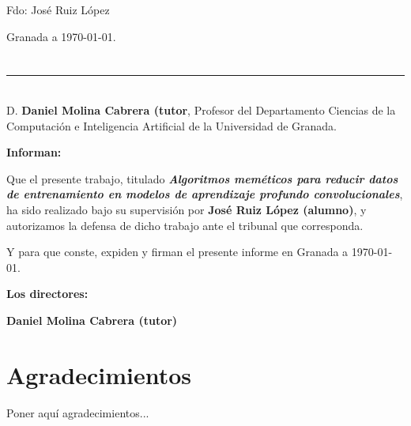 \vspace{6cm}

\noindent Fdo: José Ruiz López

\vspace{2cm}

\begin{flushright}
       Granada a \today.
\end{flushright}


\chapter*{}
\thispagestyle{empty}

\noindent\rule[-1ex]{\textwidth}{2pt}\\[4.5ex]

D. \textbf{Daniel Molina Cabrera (tutor}, Profesor del Departamento Ciencias de la Computación e Inteligencia
Artificial de la Universidad de Granada.

\vspace{0.5cm}

\textbf{Informan:}

\vspace{0.5cm}

Que el presente trabajo, titulado \textit{\textbf{Algoritmos meméticos para reducir datos de entrenamiento en modelos
              de aprendizaje profundo convolucionales}},
ha sido realizado bajo su supervisión por \textbf{José Ruiz López (alumno)}, y autorizamos la defensa de dicho trabajo
ante el tribunal que corresponda.

\vspace{0.5cm}

Y para que conste, expiden y firman el presente informe en Granada a \today.

\vspace{1cm}

\textbf{Los directores:}

\vspace{5cm}

\noindent \textbf{Daniel Molina Cabrera (tutor)}

\chapter*{Agradecimientos}
\thispagestyle{empty}

\vspace{1cm}


Poner aquí agradecimientos...

